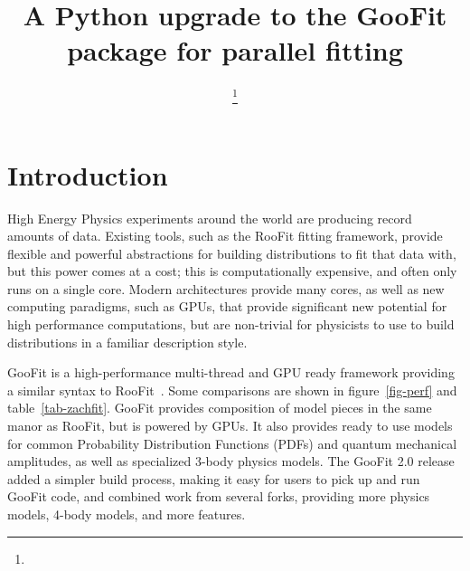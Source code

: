 \documentclass{webofc}
\begin{document}
%
\title{A Python upgrade to the GooFit package for parallel fitting}

\author{
        \fnsep\thanks{}
        \and
        \and 
        \and
        \and 
        \and 
}        %


%
\maketitle
%
\section{Introduction}
\label{intro}
High Energy Physics experiments around the world are producing record amounts of data. Existing tools, such as the RooFit fitting framework, provide flexible and powerful abstractions for building distributions to fit that data with, but this power comes at a cost; this is computationally expensive, and often only runs on a single core. Modern architectures provide many cores, as well as new computing paradigms, such as GPUs, that provide significant new potential for high performance computations, but are non-trivial for physicists to use to build distributions in a familiar description style.


GooFit is a high-performance multi-thread and GPU ready framework providing a similar syntax to RooFit~\cite{lib:RooFit,lib:GooFit:main}. Some comparisons are shown in figure~\ref{fig-perf} and table~\ref{tab-zachfit}. GooFit provides composition of model pieces in the same manor as RooFit, but is powered by GPUs. It also provides ready to use models for common Probability Distribution Functions (PDFs) and quantum mechanical amplitudes, as well as specialized 3-body physics models. The GooFit 2.0 release~\cite{lib:GooFit} added a simpler build process, making it easy for users to pick up and run GooFit code, and combined work from several forks, providing more physics models, 4-body models, and more features.
\end{document}
